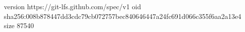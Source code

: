 version https://git-lfs.github.com/spec/v1
oid sha256:008b878447dd3cdc79cb072757bec840646447a24fc691d066c355f6aa2a13e4
size 87540
